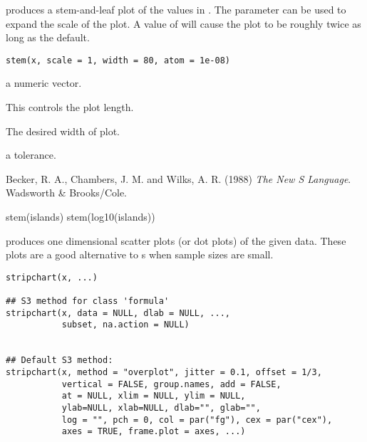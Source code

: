%
\begin{Description}\relax
{} produces a stem-and-leaf plot of the values in .
The parameter  can be used to expand the scale of the
plot.  A value of  will cause the plot to be roughly
twice as long as the default.
\end{Description}
%
\begin{Usage}
\begin{verbatim}
stem(x, scale = 1, width = 80, atom = 1e-08)
\end{verbatim}
\end{Usage}
%
\begin{Arguments}
\begin{ldescription}
\item[\code{x}] a numeric vector.
\item[\code{scale}] This controls the plot length.
\item[\code{width}] The desired width of plot.
\item[\code{atom}] a tolerance.
\end{ldescription}
\end{Arguments}
%
\begin{References}\relax
Becker, R. A., Chambers, J. M. and Wilks, A. R. (1988)
\emph{The New S Language}.
Wadsworth \& Brooks/Cole.
\end{References}
%
\begin{Examples}
\begin{ExampleCode}
stem(islands)
stem(log10(islands))
\end{ExampleCode}
\end{Examples}
%
\begin{Description}\relax
{} produces one dimensional scatter plots (or dot
plots) of the given data.  These plots are a good alternative to
s when sample sizes are small.
\end{Description}
%
\begin{Usage}
\begin{verbatim}
stripchart(x, ...)

## S3 method for class 'formula'
stripchart(x, data = NULL, dlab = NULL, ...,
           subset, na.action = NULL)


## Default S3 method:
stripchart(x, method = "overplot", jitter = 0.1, offset = 1/3,
           vertical = FALSE, group.names, add = FALSE,
           at = NULL, xlim = NULL, ylim = NULL,
           ylab=NULL, xlab=NULL, dlab="", glab="",
           log = "", pch = 0, col = par("fg"), cex = par("cex"), 
           axes = TRUE, frame.plot = axes, ...)
\end{verbatim}
\end{Usage}
